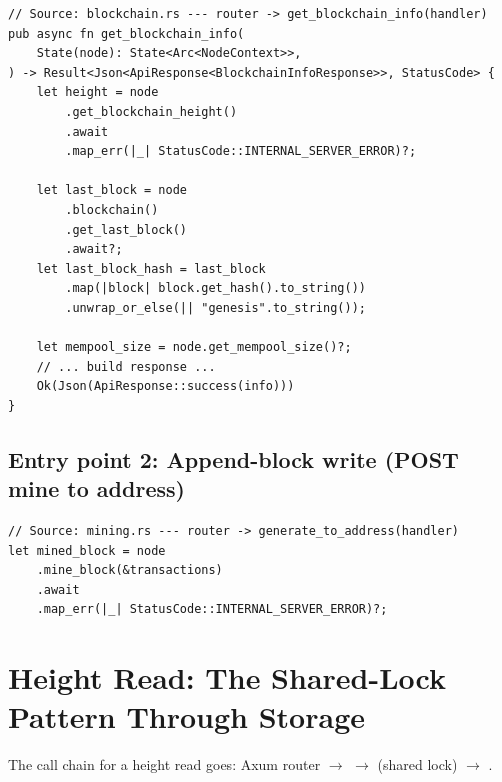 \begin{listing}[H]
\caption{Status read handler: retrieve height and tip block}
\label{lst:ch09-3-1}
\begin{verbatim}
// Source: blockchain.rs --- router -> get_blockchain_info(handler)
pub async fn get_blockchain_info(
    State(node): State<Arc<NodeContext>>,
) -> Result<Json<ApiResponse<BlockchainInfoResponse>>, StatusCode> {
    let height = node
        .get_blockchain_height()
        .await
        .map_err(|_| StatusCode::INTERNAL_SERVER_ERROR)?;

    let last_block = node
        .blockchain()
        .get_last_block()
        .await?;
    let last_block_hash = last_block
        .map(|block| block.get_hash().to_string())
        .unwrap_or_else(|| "genesis".to_string());

    let mempool_size = node.get_mempool_size()?;
    // ... build response ...
    Ok(Json(ApiResponse::success(info)))
}
\end{verbatim}
\end{listing}

\subsection{Entry point 2: Append-block write (POST mine to address)}
\label{sec:ch09-3-append-write}

\begin{listing}[H]
\caption{Mining write handler: mine and append a block}
\label{lst:ch09-3-2}
\begin{verbatim}
// Source: mining.rs --- router -> generate_to_address(handler)
let mined_block = node
    .mine_block(&transactions)
    .await
    .map_err(|_| StatusCode::INTERNAL_SERVER_ERROR)?;
\end{verbatim}
\end{listing}

\section{Height Read: The Shared-Lock Pattern Through Storage}
\label{sec:ch09-3-height-read}

The call chain for a height read goes: Axum router \(\to\)  \(\to\)  (shared lock) \(\to\) .

